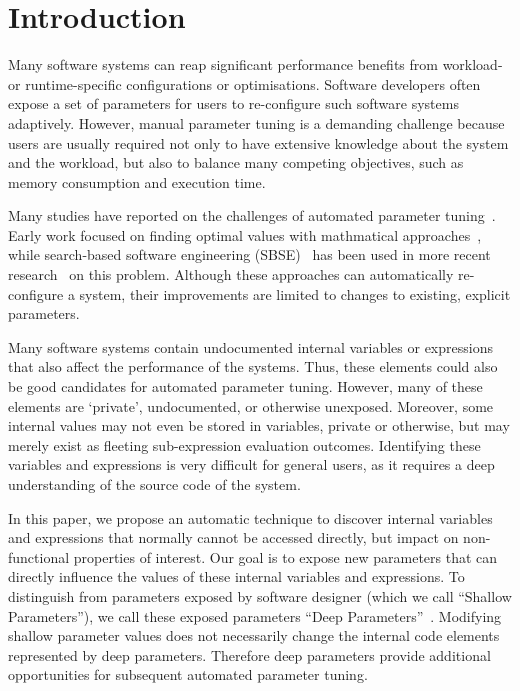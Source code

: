 
\section{Introduction}

Many software systems can reap significant performance benefits from
workload- or runtime-specific configurations or optimisations.
Software developers often expose a set of parameters for users to re-configure such software systems adaptively.
However, manual parameter tuning is a demanding challenge because users are usually required not only to have extensive knowledge about the system and the workload, but also to balance many competing objectives, such as memory consumption and execution time.

Many studies have reported on the challenges of automated parameter tuning~\cite{Hoffmann:2011:DKR:1950365.1950390, Vuduc01statisticalmodels,autotuning,Whaley:1998:ATL:509058.509096,Tapus:2002:AHT:762761.762771, hutter2009paramils,arcuri-ssbse-2011}. Early work focused on finding optimal values with mathmatical approaches~\cite{Vuduc01statisticalmodels,autotuning,Whaley:1998:ATL:509058.509096,Tapus:2002:AHT:762761.762771}, while search-based software engineering (SBSE)~\cite{Harman:2007:CSF:1253532.1254729} has been used in more recent research~\cite{hutter2009paramils,arcuri-ssbse-2011, Hoffmann:2011:DKR:1950365.1950390} on this problem. Although these approaches can automatically re-configure a system, their improvements are limited to changes to existing, explicit parameters.


Many software systems contain undocumented internal variables or
expressions that also affect the performance of the systems. Thus, these
elements could also be good candidates for automated parameter tuning.
However, many of these elements are `private', undocumented, or otherwise
unexposed.
Moreover, some internal values may
not even be stored in variables, private or otherwise, but may merely exist
as fleeting sub-expression evaluation outcomes. Identifying these variables
and expressions is very difficult for general users, as it requires a deep
understanding of the source code of the system. 


In this paper, we propose an automatic technique to discover internal variables and expressions that normally cannot be accessed directly, but impact on non-functional properties of interest. Our goal is to expose new parameters that can directly influence the values of these internal variables and expressions. To distinguish from parameters exposed by software designer (which we call ``Shallow Parameters''), we call these exposed parameters ``Deep Parameters''~\cite{Harman:2014:GIA:2593929.2600116}. Modifying shallow parameter values does not necessarily change the internal code elements represented by deep parameters. Therefore deep parameters provide additional opportunities for subsequent automated parameter tuning.



